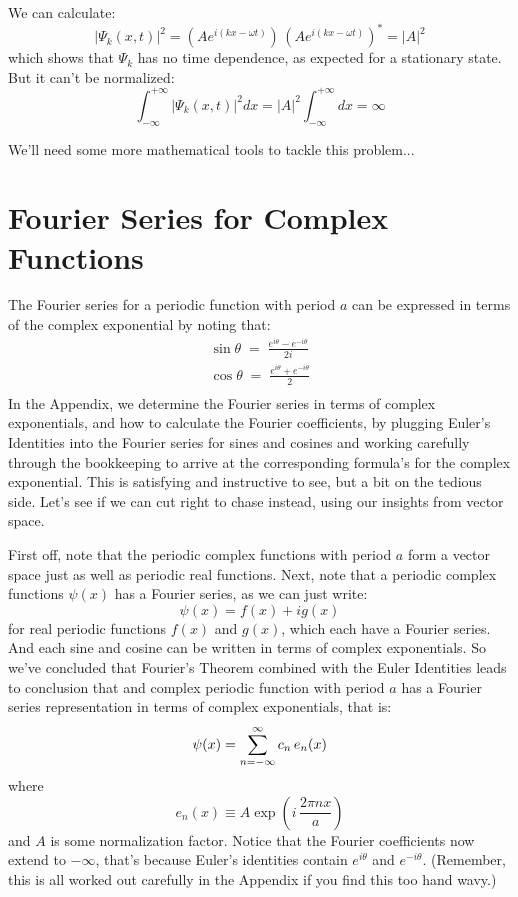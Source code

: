 \documentclass[12pt]{book}
\begin{document}
We can calculate:
$$|\Psi_k(x,t)|^2 = \left( A e^{i (k x-\omega t)} \right) \, \left( A e^{i (k x-\omega t)} \right)^*
= |A|^2$$ 
which shows that $\Psi_k$ has no time dependence, as expected for a stationary state.  But it can't be normalized:
$$\int_{-\infty}^{+\infty} |\Psi_k(x,t)|^2 dx = |A|^2 \int_{-\infty}^{+\infty} dx = \infty$$

We'll need some more mathematical tools to tackle this problem...

\section{Fourier Series for Complex Functions}

The Fourier series for a periodic function with period $a$ can be expressed in terms of the complex exponential by noting that:
\begin{eqnarray*}
\sin\theta \; = \; \frac{e^{i \theta} - e^{-i \theta}}{2i} \\[5pt]
\cos\theta \; = \; \frac{e^{i \theta} + e^{-i \theta}}{2} \\
\end{eqnarray*}
In the Appendix, we determine the Fourier series in terms of complex exponentials, and how to calculate the Fourier coefficients, by plugging Euler's Identities into the Fourier series for sines and cosines and working carefully through the bookkeeping to arrive at the corresponding formula's for the complex exponential.  This is satisfying and instructive to see, but a bit on the tedious side.  Let's see if we can cut right to chase instead, using our insights from vector space.

First off, note that the periodic complex functions with period $a$ form a vector space just as well as periodic real functions.  Next, note that a periodic complex functions $\psi(x)$ has a Fourier series, as we can just write:
$$\psi(x) = f(x) + i g(x)$$ 
for real periodic functions $f(x)$ and $g(x)$, which each have a Fourier series.  And each sine and cosine can be written in terms of complex exponentials.  So we've concluded that Fourier's Theorem combined with the Euler Identities leads to conclusion that and complex periodic function with period $a$ has a Fourier series representation in terms of complex exponentials, that is:
\begin{equation}
\psi(x) = \sum_{n=-\infty}^{\infty}  c_n \, e_n(x)  \\
\end{equation}
where
\begin{equation*}
e_n(x) \equiv A \exp\left( i \, \frac{2 \pi n x}{a}\right)
\end{equation*}
and $A$ is some normalization factor.  Notice that the Fourier coefficients now extend to $-\infty$, that's because Euler's identities contain $e^{i\theta}$ and $e^{-i\theta}$.  (Remember, this is all worked out carefully in the Appendix if you find this too hand wavy.)
\end{document}
